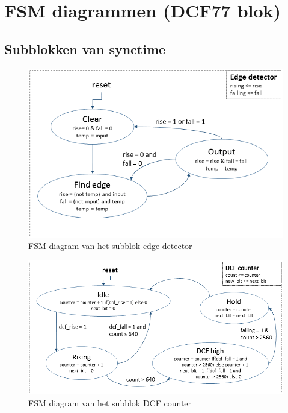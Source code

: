 \chapter[FSM diagrammen (DCF77)]{FSM diagrammen (DCF77 blok)}
\label{Ap: dcf_fsm}

\section*{Subblokken van synctime}
\begin{figure}[h!]
\begin{center}
\includegraphics[keepaspectratio=true,scale=0.7]{Figuren/DCF77/FSM_edge_detector}
\captionsetup{justification=centering}\caption{FSM diagram van het subblok edge detector}
\label{fig: edge_detector}
\end{center}
\end{figure}

\begin{figure}[h!]
\begin{center}
\includegraphics[keepaspectratio=true,scale=0.6]{Figuren/DCF77/FSM_counter}
\captionsetup{justification=centering}\caption{FSM diagram van het subblok DCF counter}
\label{fig: dcf_counter}
\end{center}
\end{figure}

